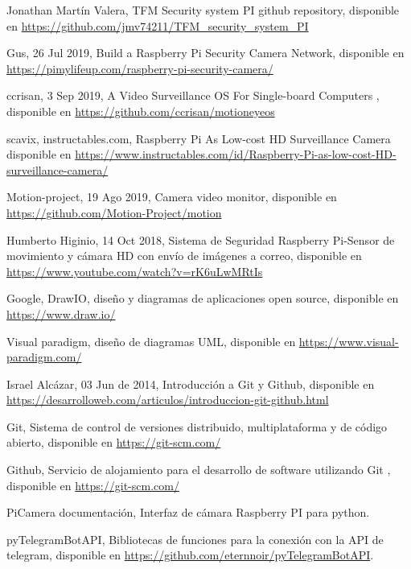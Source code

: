 \pagestyle{empty}

\begin{thebibliography}{99}

	 Jonathan Martín Valera, TFM Security system PI github repository, disponible en \url{https://github.com/jmv74211/TFM_security_system_PI}

	 Gus, 26 Jul 2019, Build a Raspberry Pi Security Camera Network,	disponible en \url{https://pimylifeup.com/raspberry-pi-security-camera/}
	
	 ccrisan, 3 Sep 2019, A Video Surveillance OS For Single-board Computers ,	disponible en \url{https://github.com/ccrisan/motioneyeos}
	
	 scavix, instructables.com, Raspberry Pi As Low-cost HD Surveillance Camera disponible en \url{https://www.instructables.com/id/Raspberry-Pi-as-low-cost-HD-surveillance-camera/}
	
	 Motion-project, 19 Ago 2019, Camera video monitor, disponible en \url{https://github.com/Motion-Project/motion}
	
	 Humberto Higinio, 14 Oct 2018, Sistema de Seguridad Raspberry Pi-Sensor de movimiento y cámara HD con envío de imágenes a correo, disponible en \url{https://www.youtube.com/watch?v=rK6uLwMRtIs}
	
	 Google, DrawIO, diseño y diagramas de aplicaciones open source, disponible en \url{https://www.draw.io/}
	
	 Visual paradigm, diseño de diagramas UML, disponible en \url{https://www.visual-paradigm.com/}
	
	 Israel Alcázar, 03 Jun de 2014,  Introducción a Git y Github, disponible en \url{https://desarrolloweb.com/articulos/introduccion-git-github.html}
	
	 Git, Sistema de control de versiones distribuido, multiplataforma y de código abierto, disponible en \url{https://git-scm.com/}
	
	 Github, Servicio de alojamiento para el desarrollo de software utilizando Git , disponible en \url{https://git-scm.com/}
	
	 PiCamera documentación, Interfaz de cámara Raspberry PI para python.
	
	 pyTelegramBotAPI, Bibliotecas de funciones para la conexión con la API de telegram, disponible en \url{https://github.com/eternnoir/pyTelegramBotAPI}.
	

\end{thebibliography}
